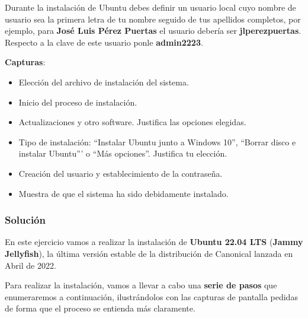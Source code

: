 Durante la instalación de Ubuntu debes definir un usuario local cuyo nombre de usuario sea la primera letra de tu nombre seguido de tus apellidos completos, por ejemplo, para \textbf{José Luis Pérez Puertas} el usuario debería ser \textbf{jlperezpuertas}. Respecto a la clave de este usuario ponle \textbf{admin2223}.

\textbf{Capturas}:
\begin{itemize}
    \item Elección del archivo de instalación del sistema.
    \item Inicio del proceso de instalación.
    \item Actualizaciones y otro software. Justifica las opciones elegidas.
    \item Tipo de instalación: ``Instalar Ubuntu junto a Windows 10'', ``Borrar disco e instalar Ubuntu''' o ``Más opciones''. Justifica tu elección.
    \item Creación del usuario y establecimiento de la contraseña.
    \item Muestra de que el sistema ha sido debidamente instalado.
\end{itemize}

\subsubsection{Solución}
En este ejercicio vamos a realizar la instalación de \textbf{Ubuntu 22.04 LTS} (\textbf{Jammy Jellyfish}), la última versión estable de la distribución de Canonical lanzada en Abril de 2022.

Para realizar la instalación, vamos a llevar a cabo una \textbf{serie de pasos} que enumeraremos a continuación, ilustrándolos con las capturas de pantalla pedidas de forma que el proceso se entienda más claramente.




%
%


